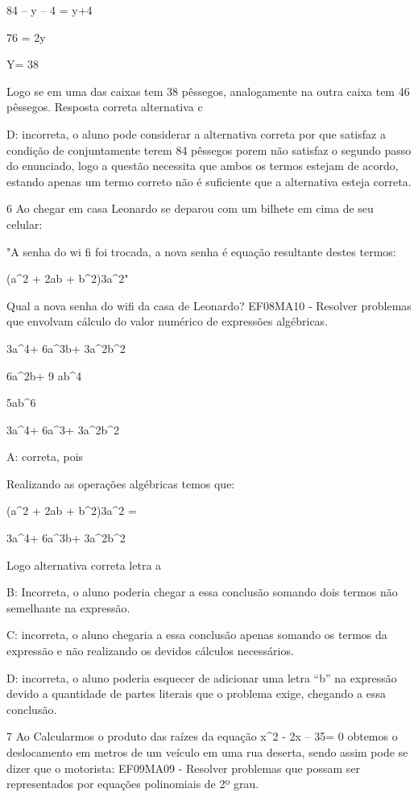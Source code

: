 84 -- y -- 4 = y+4

76 = 2y

Y= 38

Logo se em uma das caixas tem 38 pêssegos, analogamente na outra caixa
tem 46 pêssegos. Resposta correta alternativa c

D: incorreta, o aluno pode considerar a alternativa correta por que
satisfaz a condição de conjuntamente terem 84 pêssegos porem não
satisfaz o segundo passo do enunciado, logo a questão necessita que
ambos os termos estejam de acordo, estando apenas um termo correto não é
suficiente que a alternativa esteja correta.

\num{6} Ao chegar em casa Leonardo se deparou com um bilhete em cima de seu
celular:

"A senha do wi fi foi trocada, a nova senha é equação resultante destes
termos:

(a^2 + 2ab + b^2)\times 3a^2"

Qual a nova senha do wifi da casa de Leonardo? EF08MA10 - Resolver
problemas que envolvam cálculo do valor numérico de expressões
algébricas.

\item 3a^4+ 6a^3b+ 3a^2b^2
\item 6a^2b+ 9 ab^4
\item 5ab^6
\item 3a^4+ 6a^3+ 3a^2b^2

A: correta, pois

Realizando as operações algébricas temos que:

(a^2 + 2ab + b^2)\times 3a^2 =

3a^4+ 6a^3b+ 3a^2b^2

Logo alternativa correta letra a

B: Incorreta, o aluno poderia chegar a essa conclusão somando dois
termos não semelhante na expressão.

C: incorreta, o aluno chegaria a essa conclusão apenas somando os termos
da expressão e não realizando os devidos cálculos necessários.

D: incorreta, o aluno poderia esquecer de adicionar uma letra ``b'' na
expressão devido a quantidade de partes literais que o problema exige,
chegando a essa conclusão.

\num{7} Ao Calcularmos o produto das raízes da equação x^2 - 2x -- 35= 0
obtemos o deslocamento em metros de um veículo em uma rua deserta, sendo
assim pode se dizer que o motorista: EF09MA09 - Resolver problemas que
possam ser representados por equações polinomiais de 2º grau.

